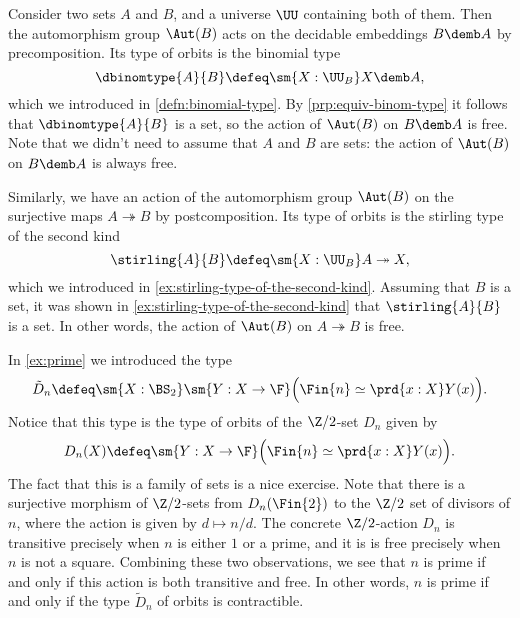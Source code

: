 \begin{eg}
  Consider two sets $A$ and $B$, and a universe $\UU$ containing both of them. Then the automorphism group $\Aut(B)$ acts on the decidable embeddings $B\demb A$ by precomposition. Its type of orbits is the binomial type
  \begin{equation*}
    \dbinomtype{A}{B}\defeq\sm{X:\UU_B}X\demb A,
  \end{equation*}
  which we introduced in \cref{defn:binomial-type}. By \cref{prp:equiv-binom-type} it follows that $\dbinomtype{A}{B}$ is a set, so the action of $\Aut(B)$ on $B\demb A$ is free. Note that we didn't need to assume that $A$ and $B$ are sets: the action of $\Aut(B)$ on $B\demb A$ is always free.

  Similarly, we have an action of the automorphism group $\Aut(B)$ on the surjective maps $A\twoheadrightarrow B$ by postcomposition. Its type of orbits is the stirling type of the second kind
  \begin{equation*}
    \stirling{A}{B}\defeq\sm{X:\UU_B}A\twoheadrightarrow X,
  \end{equation*}
  which we introduced in \cref{ex:stirling-type-of-the-second-kind}. Assuming that $B$ is a set, it was shown in \cref{ex:stirling-type-of-the-second-kind} that $\stirling{A}{B}$ is a set. In other words, the action of $\Aut(B)$ on $A\twoheadrightarrow B$ is free.
\end{eg}

\begin{eg}
  In \cref{ex:prime} we introduced the type
  \begin{equation*}
    \tilde{D}_n\defeq \sm{X:\BS_2}\sm{Y:X\to\F}\Big(\Fin{n}\simeq\prd{x:X}Y(x)\Big).
  \end{equation*}
  Notice that this type is the type of orbits of the $\Z/2$-set $D_n$ given by
  \begin{equation*}
    D_n(X)\defeq \sm{Y:X\to\F}\Big(\Fin{n}\simeq\prd{x:X}Y(x)\Big).
  \end{equation*}
  The fact that this is a family of sets is a nice exercise. Note that there is a surjective morphism of $\Z/2$-sets from $D_n(\Fin{2})$ to the $\Z/2$ set of divisors of $n$, where the action is given by $d\mapsto n/d$. The concrete $\Z/2$-action $D_n$ is transitive precisely when $n$ is either $1$ or a prime, and it is is free precisely when $n$ is not a square. Combining these two observations, we see that $n$ is prime if and only if this action is both transitive and free. In other words, $n$ is prime if and only if the type $\tilde{D}_n$ of orbits is contractible.
\end{eg}

